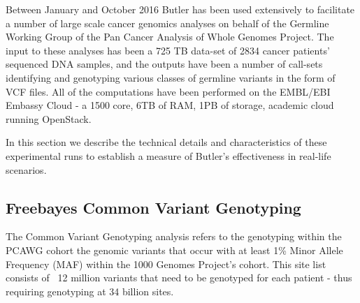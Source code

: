 Between January and October 2016 Butler has been used extensively to facilitate a number of large scale cancer genomics analyses on behalf of the Germline Working Group of the Pan Cancer Analysis of Whole Genomes Project. The input to these analyses has been a 725 TB data-set of 2834 cancer patients' sequenced DNA samples, and the outputs have been a number of call-sets identifying and genotyping various classes of germline variants in the form of VCF files. All of the computations have been performed on the EMBL/EBI Embassy Cloud - a 1500 core, 6TB of RAM, 1PB of storage, academic cloud running OpenStack.

In this section we describe the technical details and characteristics of these experimental runs to establish a measure of Butler's effectiveness in real-life scenarios.

\subsection{Freebayes Common Variant Genotyping}

The Common Variant Genotyping analysis refers to the genotyping within the PCAWG cohort the genomic variants that occur with at least 1\% Minor Allele Frequency (MAF) within the 1000 Genomes Project's\autocite{10002012integrated} cohort. This site list consists of ~12 million variants that need to be genotyped for each patient - thus requiring genotyping at 34 billion sites.

